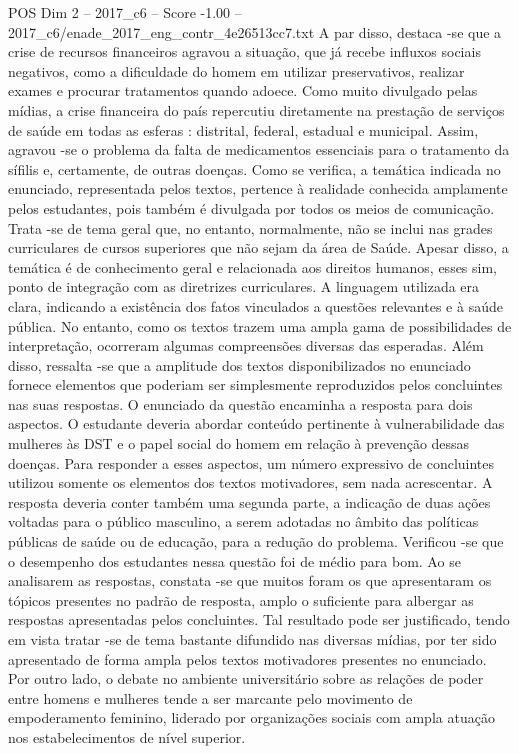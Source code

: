 \begin{textsample}{POS Dim 2 – 2017\_c6 – Score -1.00 – 2017\_c6/enade\_2017\_eng\_contr\_4e26513cc7.txt}
A par disso, destaca -se que a crise de recursos financeiros agravou a situação, que já recebe influxos sociais negativos, como a dificuldade do homem em utilizar preservativos, realizar exames e procurar tratamentos quando adoece.
Como muito divulgado pelas mídias, a crise financeira do país repercutiu diretamente na prestação de serviços de saúde em todas as esferas : distrital, federal, estadual e municipal.
Assim, agravou -se o problema da falta de medicamentos essenciais para o tratamento da sífilis e, certamente, de outras doenças.
Como se verifica, a temática indicada no enunciado, representada pelos textos, pertence à realidade conhecida amplamente pelos estudantes, pois também é divulgada por todos os meios de comunicação.
Trata -se de tema geral que, no entanto, normalmente, não se inclui nas grades curriculares de cursos superiores que não sejam da área de Saúde.
Apesar disso, a temática é de conhecimento geral e relacionada aos direitos humanos, esses sim, ponto de integração com as diretrizes curriculares.
A linguagem utilizada era clara, indicando a existência dos fatos vinculados a questões relevantes e à saúde pública.
No entanto, como os textos trazem uma ampla gama de possibilidades de interpretação, ocorreram algumas compreensões diversas das esperadas.
Além disso, ressalta -se que a amplitude dos textos disponibilizados no enunciado fornece elementos que poderiam ser simplesmente reproduzidos pelos concluintes nas suas respostas.
O enunciado da questão encaminha a resposta para dois aspectos.
O estudante deveria abordar conteúdo pertinente à vulnerabilidade das mulheres às DST e o papel social do homem em relação à prevenção dessas doenças.
Para responder a esses aspectos, um número expressivo de concluintes utilizou somente os elementos dos textos motivadores, sem nada acrescentar.
A resposta deveria conter também uma segunda parte, a indicação de duas ações voltadas para o público masculino, a serem adotadas no âmbito das políticas públicas de saúde ou de educação, para a redução do problema.
Verificou -se que o desempenho dos estudantes nessa questão foi de médio para bom.
Ao se analisarem as respostas, constata -se que muitos foram os que apresentaram os tópicos presentes no padrão de resposta, amplo o suficiente para albergar as respostas apresentadas pelos concluintes.
Tal resultado pode ser justificado, tendo em vista tratar -se de tema bastante difundido nas diversas mídias, por ter sido apresentado de forma ampla pelos textos motivadores presentes no enunciado.
Por outro lado, o debate no ambiente universitário sobre as relações de poder entre homens e mulheres tende a ser marcante pelo movimento de empoderamento feminino, liderado por organizações sociais com ampla atuação nos estabelecimentos de nível superior.

\end{textsample}
